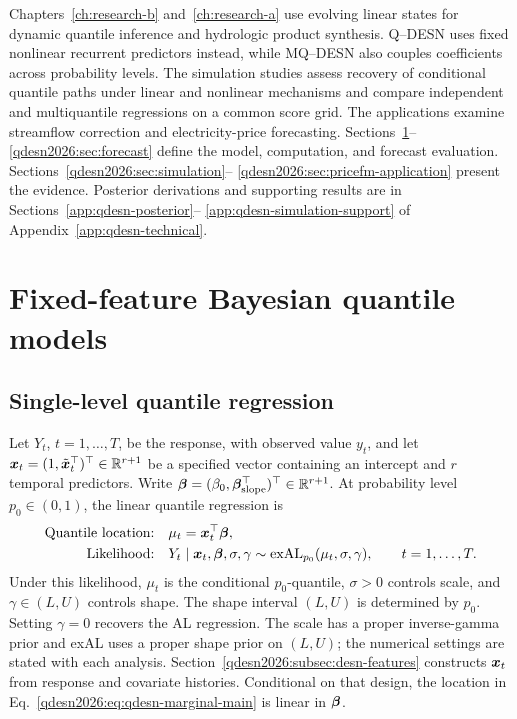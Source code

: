 Chapters~\ref{ch:research-b} and~\ref{ch:research-a} use evolving linear states
for dynamic quantile inference and hydrologic product synthesis. Q--DESN uses
fixed nonlinear recurrent predictors instead, while MQ--DESN also couples
coefficients across probability levels. The simulation studies assess recovery
of conditional quantile paths under linear and nonlinear mechanisms and compare
independent and multiquantile regressions on a common score grid. The
applications examine streamflow correction and electricity-price forecasting.
Sections~\ref{qdesn2026:sec:model}--%
\ref{qdesn2026:sec:forecast} define the model, computation, and forecast
evaluation. Sections~\ref{qdesn2026:sec:simulation}--%
\ref{qdesn2026:sec:pricefm-application} present the evidence. Posterior
derivations and supporting results are in Sections~\ref{app:qdesn-posterior}--%
\ref{app:qdesn-simulation-support} of Appendix~\ref{app:qdesn-technical}.


\section{Fixed-feature Bayesian quantile models}
\label{qdesn2026:sec:model}

\subsection{Single-level quantile regression}

Let \(Y_t\), \(t=1,\ldots,T\), be the response, with observed value
\(y_t\), and let
\(\boldsymbol{x}_t=(1,\tilde{\boldsymbol{x}}_t^\top)^\top\in\mathbb{R}^{r+1}\) be a specified
vector containing an intercept and \(r\) temporal predictors. Write
\(\boldsymbol{\beta}=(\beta_0,\boldsymbol{\beta}_{\mathrm{slope}}^\top)^\top\in\mathbb{R}^{r+1}\).
At probability level \(p_0\in(0,1)\), the linear quantile regression is
\begin{equation}
\begin{aligned}
\text{Quantile location:}\quad &\mu_t=\boldsymbol{x}_t^\top\boldsymbol{\beta},\\
\text{Likelihood:}\quad
&Y_t\mid\boldsymbol{x}_t,\boldsymbol{\beta},\sigma,\gamma
  \sim\operatorname{exAL}_{p_0}(\mu_t,\sigma,\gamma),\qquad t=1,\ldots,T.
\end{aligned}
\label{qdesn2026:eq:qdesn-marginal-main}
\end{equation}
Under this likelihood, \(\mu_t\) is the conditional \(p_0\)-quantile,
\(\sigma>0\) controls scale, and \(\gamma\in(L,U)\) controls shape. The
shape interval \((L,U)\) is determined by \(p_0\). Setting \(\gamma=0\)
recovers the AL regression. The scale has a proper inverse-gamma prior and
exAL uses a proper shape prior on \((L,U)\); the numerical settings are stated
with each analysis. Section~\ref{qdesn2026:subsec:desn-features} constructs
\(\boldsymbol{x}_t\) from response and covariate histories. Conditional on that
design, the location in Eq.~\eqref{qdesn2026:eq:qdesn-marginal-main} is linear
in \(\boldsymbol{\beta}\).

